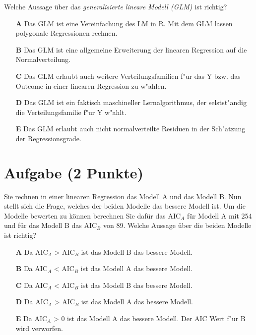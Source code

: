 \documentclass[a4paper, 10pt]{scrartcl}\usepackage[]{graphicx}\usepackage[]{xcolor}
\begin{document}
Welche Aussage {\"u}ber das \textit{generalisierte lineare Modell (GLM)} ist richtig?  



\begin{enumerate}
\item [\textbf{A} \msquare] Das GLM ist eine Vereinfachung des LM in R. Mit dem GLM lassen polygonale Regressionen rechnen.
\item [\textbf{B} \msquare] Das GLM ist eine allgemeine Erweiterung der linearen Regression auf die Normalverteilung.
\item [\textbf{C} \msquare] Das GLM erlaubt auch weitere Verteilungsfamilien f{"u}r das Y bzw. das Outcome in einer linearen Regression zu w{"a}hlen.
\item [\textbf{D} \msquare] Das GLM ist ein faktisch maschineller Lernalgorithmus, der selstst{"a}ndig die Verteilungsfamilie f{"u}r Y w{"a}hlt.
\item [\textbf{E} \msquare] Das GLM erlaubt auch nicht normalverteilte Residuen in der Sch{"a}tzung der Regressionsgrade.
\end{enumerate}

\section{Aufgabe \hfill (2 Punkte)}



Sie rechnen in einer linearen Regression das Modell A und das Modell B. Nun
stellt sich die Frage, welches der beiden Modelle das bessere Modell
ist. Um die Modelle bewerten zu k{\"o}nnen berechnen Sie daf{\"u}r das AIC$_A$ f{\"u}r
Modell A mit 254 und f{\"u}r das Modell B das AIC$_B$ von
89. Welche Aussage {\"u}ber die beiden Modelle ist richtig?



\begin{enumerate}
\item [\textbf{A} \msquare] Da AIC$_A$ > AIC$_B$ ist das Modell B das bessere Modell.
\item [\textbf{B} \msquare] Da AIC$_A$ < AIC$_B$ ist das Modell A das bessere Modell.
\item [\textbf{C} \msquare] Da AIC$_A$ < AIC$_B$ ist das Modell B das bessere Modell.
\item [\textbf{D} \msquare] Da AIC$_A$ > AIC$_B$ ist das Modell A das bessere Modell.
\item [\textbf{E} \msquare] Da AIC$_A$ > 0 ist das Modell A das bessere Modell. Der AIC Wert f{"u}r B wird verworfen.
\end{enumerate}
\end{document}
